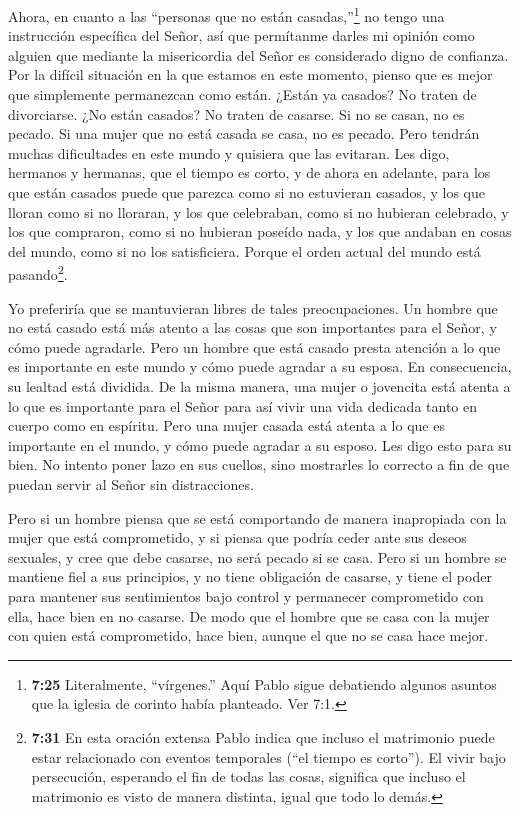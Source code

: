  Ahora, en cuanto a las ``personas que no están
casadas,''\footnote{\textbf{7:25} Literalmente, ``vírgenes.'' Aquí Pablo
  sigue debatiendo algunos asuntos que la iglesia de corinto había
  planteado. Ver 7:1.} no tengo una instrucción específica del Señor,
así que permítanme darles mi opinión como alguien que mediante la
misericordia del Señor es considerado digno de confianza. 
Por la difícil situación en la que estamos en este momento, pienso que
es mejor que simplemente permanezcan como están.  ¿Están ya
casados? No traten de divorciarse. ¿No están casados? No traten de
casarse.  Si no se casan, no es pecado. Si una mujer que no
está casada se casa, no es pecado. Pero tendrán muchas dificultades en
este mundo y quisiera que las evitaran.  Les digo, hermanos
y hermanas, que el tiempo es corto, y de ahora en adelante, para los que
están casados puede que parezca como si no estuvieran casados,
 y los que lloran como si no lloraran, y los que
celebraban, como si no hubieran celebrado, y los que compraron, como si
no hubieran poseído nada,  y los que andaban en cosas del
mundo, como si no los satisficiera. Porque el orden actual del mundo
está pasando\footnote{\textbf{7:31} En esta oración extensa Pablo indica
  que incluso el matrimonio puede estar relacionado con eventos
  temporales (``el tiempo es corto''). El vivir bajo persecución,
  esperando el fin de todas las cosas, significa que incluso el
  matrimonio es visto de manera distinta, igual que todo lo demás.}.

 Yo preferiría que se mantuvieran libres de tales
preocupaciones. Un hombre que no está casado está más atento a las cosas
que son importantes para el Señor, y cómo puede agradarle. 
Pero un hombre que está casado presta atención a lo que es importante en
este mundo y cómo puede agradar a su esposa.  En
consecuencia, su lealtad está dividida. De la misma manera, una mujer o
jovencita está atenta a lo que es importante para el Señor para así
vivir una vida dedicada tanto en cuerpo como en espíritu. Pero una mujer
casada está atenta a lo que es importante en el mundo, y cómo puede
agradar a su esposo.  Les digo esto para su bien. No
intento poner lazo en sus cuellos, sino mostrarles lo correcto a fin de
que puedan servir al Señor sin distracciones.

 Pero si un hombre piensa que se está comportando de manera
inapropiada con la mujer que está comprometido, y si piensa que podría
ceder ante sus deseos sexuales, y cree que debe casarse, no será pecado
si se casa.  Pero si un hombre se mantiene fiel a sus
principios, y no tiene obligación de casarse, y tiene el poder para
mantener sus sentimientos bajo control y permanecer comprometido con
ella, hace bien en no casarse.  De modo que el hombre que
se casa con la mujer con quien está comprometido, hace bien, aunque el
que no se casa hace mejor.

